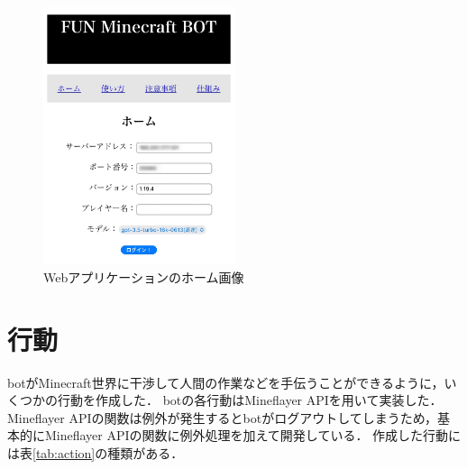 \begin{figure}[H]
    \centering
    \includegraphics[width=0.5\textwidth]{fig/web_app.jpg}
    \caption{Webアプリケーションのホーム画像}
    \label{fig:web_app}
\end{figure}

\section{行動}\label{sec:act}
botがMinecraft世界に干渉して人間の作業などを手伝うことができるように，いくつかの行動を作成した．
botの各行動はMineflayer API\cite{bib:Mineflayer}を用いて実装した．
Mineflayer APIの関数は例外が発生するとbotがログアウトしてしまうため，基本的にMineflayer APIの関数に例外処理を加えて開発している．
作成した行動には表\ref{tab:action}の種類がある．

